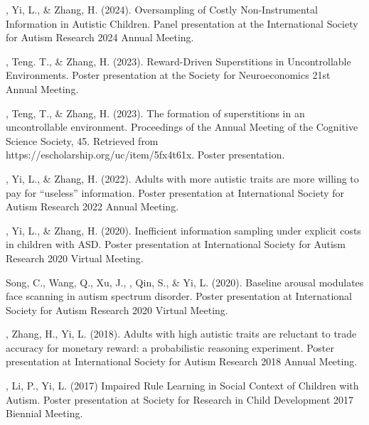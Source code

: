 \begin{etaremune}
  \item \ME, Yi, L., \& Zhang, H. (2024). Oversampling of Costly Non-Instrumental Information in Autistic Children. Panel presentation at the International Society for Autism Research 2024 Annual Meeting.
  \item \ME, Teng. T., \& Zhang, H. (2023). Reward-Driven Superstitions in Uncontrollable Environments. Poster presentation at the Society for Neuroeconomics 21st Annual Meeting.
  \item \ME, Teng, T., \& Zhang, H. (2023). The formation of superstitions in an uncontrollable environment. Proceedings of the Annual Meeting of the Cognitive Science Society, 45. Retrieved from \\https://escholarship.org/uc/item/5fx4t61x. Poster presentation.
  \item \ME, Yi, L., \& Zhang, H. (2022). Adults with more autistic traits are more willing to pay for “useless” information. Poster presentation at International Society for Autism Research 2022 Annual Meeting.
  \item \ME, Yi, L., \& Zhang, H. (2020). Inefficient information sampling under explicit costs in children with ASD. Poster presentation at International Society for Autism Research 2020 Virtual Meeting.
  \item Song, C., Wang, Q., Xu, J., \ME, Qin, S., \& Yi, L. (2020). Baseline arousal modulates face scanning in autism spectrum disorder. Poster presentation at International Society for Autism Research 2020 Virtual Meeting.
  \item \ME, Zhang, H., Yi, L. (2018). Adults with high autistic traits are reluctant to trade accuracy for monetary reward: a probabilistic reasoning experiment. Poster presentation at International Society for Autism Research 2018 Annual Meeting.
  \item \ME, Li, P., Yi, L. (2017) Impaired Rule Learning in Social Context of Children with Autism. Poster presentation at Society for Research in Child Development 2017 Biennial Meeting.
\end{etaremune}

